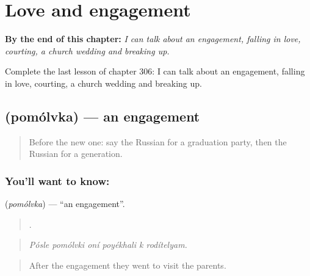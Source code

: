 
\chapter{Love and engagement}
\label{ch:ru-love-and-engagement}

\begin{chapteropening}
\textbf{By the end of this chapter:} \emph{I can talk about an engagement, falling in love, courting, a church wedding and breaking up.}

Complete the last lesson of chapter 306: I can talk about an engagement, falling in love, courting, a church wedding and breaking up.
\end{chapteropening}

\section[\texorpdfstring{\ru{помолвка} (pomólvka)}{помолвка (pomólvka)}]{ (pomólvka) — an engagement}

\label{lesson:RU-C306-pomolvka}



\begin{quote}
Before the new one: say the Russian for a graduation party, then the Russian for a generation.
\end{quote}

\subsection*{You'll want to know: }
\textbf{} (\emph{pomólvka}) — \textquotedblleft{}an engagement\textquotedblright{}.

\begin{quote}
     .
\end{quote}

\begin{quote}
\emph{Pósle pomólvki oní poyékhali k rodítelyam.}
\end{quote}

\begin{quote}
After the engagement they went to visit the parents.
\end{quote}

